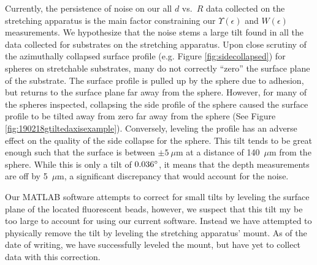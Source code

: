 Currently, the persistence of noise on our all $ d $ vs.~$ R $ data collected on the stretching apparatus is the main factor constraining our $ \Upsilon(\epsilon) $ and $ W(\epsilon) $ measurements. We hypothesize that the noise stems a large tilt found in all the data collected for substrates on the stretching apparatus. Upon close scrutiny of the azimuthally collapsed surface profile (e.g. Figure \ref{fig:sidecollapsed}) for spheres on stretchable substrates, many do not correctly ``zero'' the surface plane of the substrate. The surface profile is pulled up by the sphere due to adhesion, but returns to the surface plane far away from the sphere. However, for many of the spheres inspected, collapsing the side profile of the sphere caused the surface profile to be tilted away from zero far away from the sphere (See Figure \ref{fig:190218gtiltedaxisexample}). Conversely, leveling the profile has an adverse effect on the quality of the side collapse for the sphere. This tilt tends to be great enough such that the surface is between $ \pm 5~\mu$m at a distance of 140~$ \mu $m from the sphere. While this is only a tilt of $ 0.036 \degree $, it means that the depth measurements are off by 5~$ \mu $m, a significant discrepancy that would account for the noise.

Our MATLAB software attempts to correct for small tilts by leveling the surface plane of the located fluorescent beads, however, we suspect that this tilt my be too large to account for using our current software. Instead we have attempted to physically remove the tilt by leveling the stretching apparatus' mount. As of the date of writing, we have successfully leveled the mount, but have yet to collect data with this correction. 
